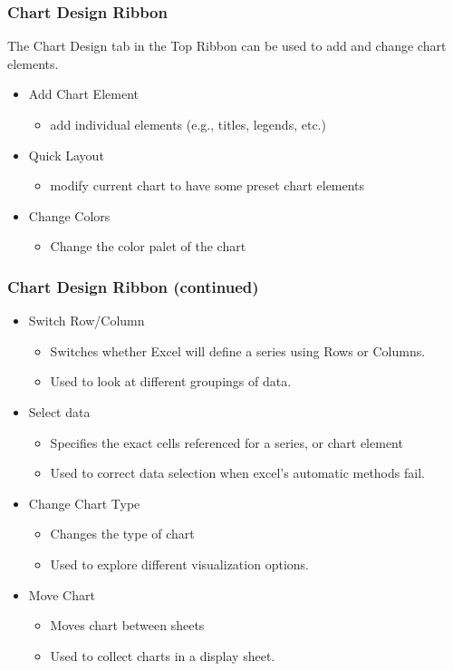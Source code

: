 \documentclass[12pt]{beamer}
\begin{document}
	\begin{frame}
		\frametitle{Chart Design Ribbon}
	The Chart Design tab in the Top Ribbon can be used to add and change chart elements.  
	\begin{itemize}
		\item Add Chart Element
		\begin{itemize}
			\item add individual elements (e.g., titles, legends, etc.)
		\end{itemize}
		\item Quick Layout
		\begin{itemize}
			\item modify current chart to have some preset chart elements
		\end{itemize}
		\item Change Colors
			\begin{itemize}
				\item Change the color palet of the chart 
			\end{itemize}
	\end{itemize}
\end{frame}
	\begin{frame}
		\frametitle{Chart Design Ribbon (continued)}
		\begin{itemize}
				\item Switch Row/Column
			\begin{itemize}
				\item Switches whether Excel will define a series using Rows or Columns.
				\item Used to look at different groupings of data.
			\end{itemize}
			\item Select data
			\begin{itemize}
				\item Specifies the exact cells referenced for a series, or chart element
				\item Used to correct data selection when excel's automatic methods fail.
			\end{itemize}
			\item Change Chart Type
			\begin{itemize}
				\item Changes the type of chart
				\item Used to explore different visualization options.
			\end{itemize}
			\item Move Chart
			\begin{itemize}
				\item Moves chart between sheets
				\item Used to collect charts in a display sheet.
			\end{itemize}
		\end{itemize}	
	\end{frame}
\end{document}
